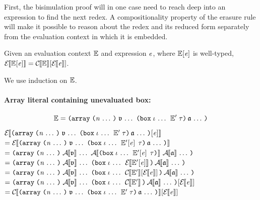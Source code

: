 First, the bisimulation proof will in one case need to
reach deep into an expression to find the next redex.
A compositionality property of the erasure rule
will make it possible to reason about the redex and its reduced form
separately from the evaluation context in which it is embedded.

\begin{lemma}
  \label{ErasureInContext}
  Given an evaluation context $\mathbb{E}$ and expression $\mathit{e}$,
  where ${\mathbb{E}\hskip-.15em\left[\mathit{e}\right]}$ is well-typed,
  $\mathcal{E}{\hskip-.25em}\left\llbracket \mathbb{E}\hskip-.15em\left[\mathit{e}\right] \right\rrbracket = \mathcal{C}{\hskip-.25em}\left\llbracket \mathbb{E} \right\rrbracket\hskip-.15em\left[\mathcal{E}{\hskip-.25em}\left\llbracket \mathit{e} \right\rrbracket\right]$.
\end{lemma}
\begin{sproof}
  We use induction on $\mathbb{E}$.

\paragraph{Array literal containing unevaluated box:}
  \[\ctxt = \arrlit{\sequence{\atval}\,\dsum{\sequence{\idx}}{\ctxt'}{\type}\,\sequence{\atom}}{\sequence{\nat}}\]
  $\EraseE{\fillc
    {\arrlit{\sequence{\atval}\,\dsum{\sequence{\idx}}{\ctxt'}{\type}\,\sequence{\atom}}{\sequence{\nat}}}
    {\expr}}$ \\
  $= \EraseE{\arrlit
    {\sequence{\atval}\,\dsum{\sequence{\idx}}{\fillc{\ctxt'}{\expr}}{\type}\,\sequence{\atom}}
    {\sequence{\nat}}}$ \\
  $= \arrlit
  {\sequence{\EraseA{\atval}}\,\EraseA{\dsum{\sequence{\idx}}{\fillc{\ctxt'}{\expr}}{\type}}\,\sequence{\EraseA{\atom}}}
  {\sequence{\nat}}$ \\
  $= \arrlit
  {\sequence{\EraseA{\atval}}\,\dsum{\sequence{\idx}}{\EraseE{\fillc{\ctxt'}{\expr}}}{}\,\sequence{\EraseA{\atom}}}
  {\sequence{\nat}}$ \\
  $= \arrlit
  {\sequence{\EraseA{\atval}}\,\dsum{\sequence{\idx}}{\fillc{\EraseC{\ctxt'}}{\EraseE{\expr}}}{}\,\sequence{\EraseA{\atom}}}
  {\sequence{\nat}}$ \\
  $= \fillc{\arrlit
    {\sequence{\EraseA{\atval}}\,\dsum{\sequence{\idx}}{\EraseC{\ctxt'}}{}\,\sequence{\EraseA{\atom}}}
    {\sequence{\nat}}}
  {\EraseE{\expr}}$ \\
  $= \fillc{\EraseC{\arrlit
    {\sequence{\atval}\,\dsum{\sequence{\idx}}{\ctxt'}{\type}\,\sequence{\atom}}
    {\sequence{\nat}}}}
  {\EraseE{\expr}}$ \\


\end{sproof}
